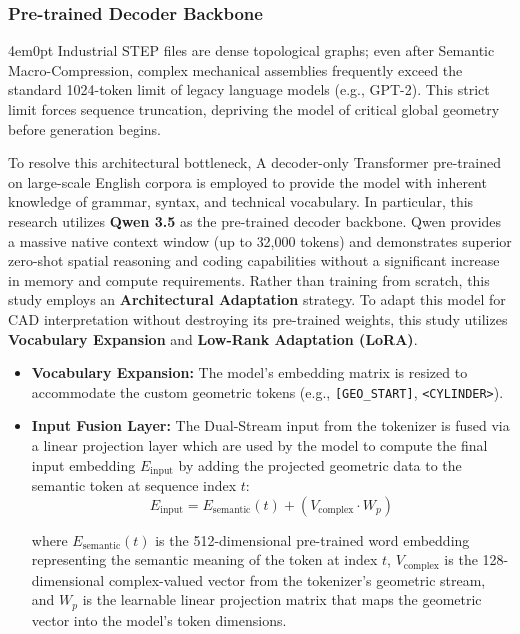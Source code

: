 		\subsubsection{Pre-trained Decoder Backbone}
			\begin{indentedblock}{4em}{0pt}
				Industrial STEP files are dense topological graphs; even after Semantic Macro-Compression, complex mechanical assemblies frequently exceed the standard 1024-token limit of legacy language models (e.g., GPT-2). This strict limit forces sequence truncation, depriving the model of critical global geometry before generation begins. 
				
				To resolve this architectural bottleneck, A decoder-only Transformer pre-trained on large-scale English corpora is employed to provide the model with inherent knowledge of grammar, syntax, and technical vocabulary. In particular, this research utilizes \textbf{Qwen 3.5} as the pre-trained decoder backbone. Qwen provides a massive native context window (up to 32,000 tokens) and demonstrates superior zero-shot spatial reasoning and coding capabilities without a significant increase in memory and compute requirements. Rather than training from scratch, this study employs an \textbf{Architectural Adaptation} strategy. To adapt this model for CAD interpretation without destroying its pre-trained weights, this study utilizes \textbf{Vocabulary Expansion} and \textbf{Low-Rank Adaptation (LoRA)}.
				
				\begin{itemize}
					\item \textbf{Vocabulary Expansion:} The model's embedding matrix is resized to accommodate the custom geometric tokens (e.g., \texttt{[GEO\_START]}, \texttt{<CYLINDER>}).
					
					\item \textbf{Input Fusion Layer:} The Dual-Stream input from the tokenizer is fused via a linear projection layer which are used by the model to compute the final input embedding $E_{\text{input}}$ by adding the projected geometric data to the semantic token at sequence index $t$:
					\begin{equation}
						E_{\text{input}} = E_{\text{semantic}}(t) + (V_{\text{complex}} \cdot W_p)
					\end{equation}
					
					where $E_{\text{semantic}}(t)$ is the 512-dimensional pre-trained word embedding representing the semantic meaning of the token at index $t$, $V_{\text{complex}}$ is the 128-dimensional complex-valued vector from the tokenizer's geometric stream, and $W_p$ is the learnable linear projection matrix that maps the geometric vector into the model's token dimensions.
				\end{itemize}
			\end{indentedblock}
	
